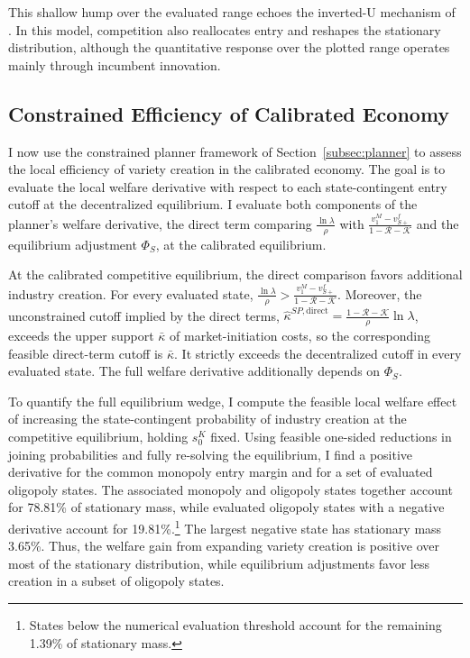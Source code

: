 \documentclass[12pt]{article}
\begin{document}
This shallow hump over the evaluated range echoes the inverted-U mechanism of \citet{AghionBBGH05}. In this model, competition also reallocates entry and reshapes the stationary distribution, although the quantitative response over the plotted range operates mainly through incumbent innovation.

\subsection{Constrained Efficiency of Calibrated Economy}\label{subsec:quant_planner}

I now use the constrained planner framework of Section~\ref{subsec:planner} to assess the local efficiency of variety creation in the calibrated economy. The goal is to evaluate the local welfare derivative with respect to each state-contingent entry cutoff at the decentralized equilibrium. I evaluate both components of the planner's welfare derivative, the direct term comparing \(\frac{\ln\lambda}{\rho}\) with \(\frac{v^M_1-v^f_{S+}}{1-\mathcal{R}-\mathcal{K}}\) and the equilibrium adjustment \(\Phi_S\), at the calibrated equilibrium.

At the calibrated competitive equilibrium, the direct comparison favors additional industry creation. For every evaluated state, \(\frac{\ln\lambda}{\rho}>\frac{v^M_1-v^f_{S+}}{1-\mathcal{R}-\mathcal{K}}.\) Moreover, the unconstrained cutoff implied by the direct terms, \(\hat{\kappa}^{SP,\mathrm{direct}}=\frac{1-\mathcal{R}-\mathcal{K}}{\rho}\ln\lambda\), exceeds the upper support \(\bar\kappa\) of market-initiation costs, so the corresponding feasible direct-term cutoff is \(\bar\kappa\). It strictly exceeds the decentralized cutoff in every evaluated state. The full welfare derivative additionally depends on \(\Phi_S\).

To quantify the full equilibrium wedge, I compute the feasible local welfare effect of increasing the state-contingent probability of industry creation at the competitive equilibrium, holding \(s^K_0\) fixed. Using feasible one-sided reductions in joining probabilities and fully re-solving the equilibrium, I find a positive derivative for the common monopoly entry margin and for a set of evaluated oligopoly states. The associated monopoly and oligopoly states together account for 78.81\% of stationary mass, while evaluated oligopoly states with a negative derivative account for 19.81\%.\footnote{States below the numerical evaluation threshold account for the remaining 1.39\% of stationary mass.} The largest negative state has stationary mass 3.65\%. Thus, the welfare gain from expanding variety creation is positive over most of the stationary distribution, while equilibrium adjustments favor less creation in a subset of oligopoly states.
\end{document}
